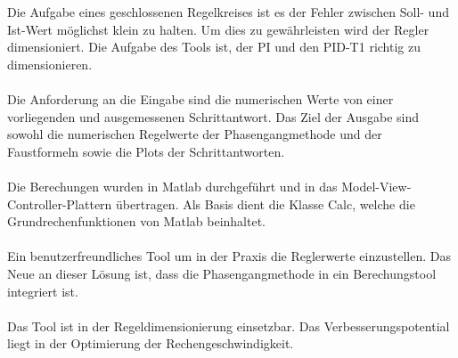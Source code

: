 Die Aufgabe eines geschlossenen Regelkreises ist es der Fehler zwischen Soll- und Ist-Wert möglichst klein zu halten. Um dies zu gewährleisten wird der Regler dimensioniert. Die Aufgabe des Tools ist, der PI und den PID-T1 richtig zu dimensionieren. \\
\\
Die Anforderung an die Eingabe sind die numerischen Werte von einer vorliegenden und ausgemessenen Schrittantwort. Das Ziel der Ausgabe sind sowohl die numerischen Regelwerte der Phasengangmethode und der Faustformeln sowie die Plots der Schrittantworten.\\
\\
Die Berechungen wurden in Matlab durchgeführt und in das Model-View-Controller-Plattern übertragen. Als Basis dient die Klasse Calc, welche die Grundrechenfunktionen von Matlab beinhaltet. \\
\\
Ein benutzerfreundliches Tool um in der Praxis die Reglerwerte einzustellen. Das Neue an dieser Lösung ist, dass die Phasengangmethode in ein Berechungstool integriert ist.\\
\\
Das Tool ist in der Regeldimensionierung einsetzbar. Das Verbesserungspotential liegt in der Optimierung der Rechengeschwindigkeit.

